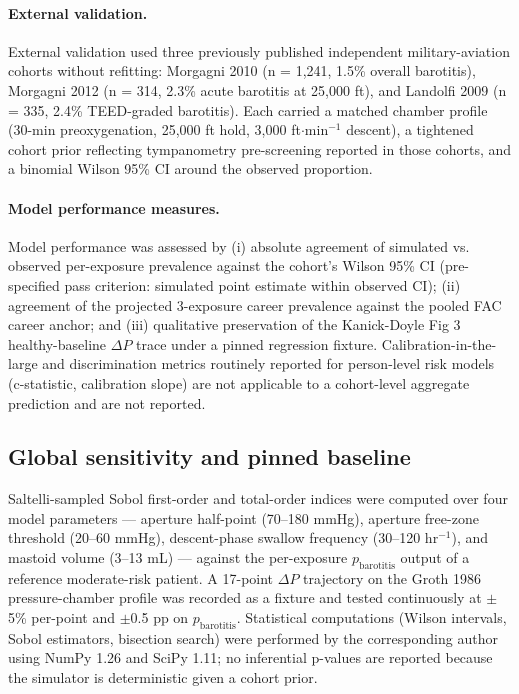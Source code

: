 \documentclass[11pt,a4paper]{article}
\begin{document}
\paragraph{External validation.}
External validation used three previously published independent military-aviation cohorts \citep{Morgagni2012,Landolfi2009,Morgagni2010} without refitting: Morgagni 2010 (n = 1,241, 1.5\% overall barotitis), Morgagni 2012 (n = 314, 2.3\% acute barotitis at 25,000 ft), and Landolfi 2009 (n = 335, 2.4\% TEED-graded barotitis). Each carried a matched chamber profile (30-min preoxygenation, 25,000 ft hold, 3,000 ft$\cdot$min$^{-1}$ descent), a tightened cohort prior reflecting tympanometry pre-screening reported in those cohorts, and a binomial Wilson 95\% CI around the observed proportion.

\paragraph{Model performance measures.}
Model performance was assessed by (i) absolute agreement of simulated vs. observed per-exposure prevalence against the cohort's Wilson 95\% CI (pre-specified pass criterion: simulated point estimate within observed CI); (ii) agreement of the projected 3-exposure career prevalence against the pooled FAC career anchor; and (iii) qualitative preservation of the Kanick-Doyle Fig 3 healthy-baseline $\Delta P$ trace under a pinned regression fixture. Calibration-in-the-large and discrimination metrics routinely reported for person-level risk models (c-statistic, calibration slope) are not applicable to a cohort-level aggregate prediction and are not reported.

\subsection{Global sensitivity and pinned baseline}

Saltelli-sampled Sobol first-order and total-order indices \citep{Saltelli2010} were computed over four model parameters --- aperture half-point (70--180 mmHg), aperture free-zone threshold (20--60 mmHg), descent-phase swallow frequency (30--120 hr$^{-1}$), and mastoid volume (3--13 mL) --- against the per-exposure $p_{\mathrm{barotitis}}$ output of a reference moderate-risk patient. A 17-point $\Delta P$ trajectory on the Groth 1986 pressure-chamber profile was recorded as a fixture and tested continuously at $\pm$5\% per-point and $\pm$0.5 pp on $p_{\mathrm{barotitis}}$. Statistical computations (Wilson intervals, Sobol estimators, bisection search) were performed by the corresponding author using NumPy 1.26 and SciPy 1.11; no inferential p-values are reported because the simulator is deterministic given a cohort prior.
\end{document}
